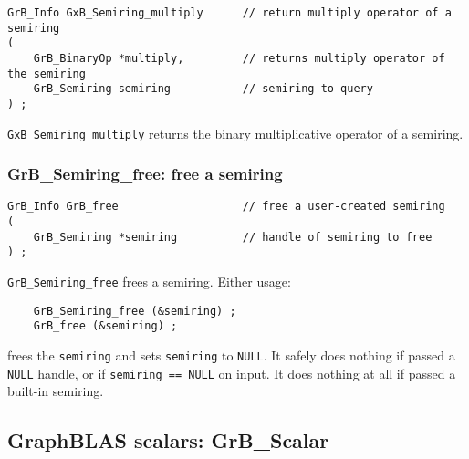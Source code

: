 \documentclass[12pt]{article}
\begin{document}
\begin{mdframed}[userdefinedwidth=6in]
{\footnotesize
\begin{verbatim}
GrB_Info GxB_Semiring_multiply      // return multiply operator of a semiring
(
    GrB_BinaryOp *multiply,         // returns multiply operator of the semiring
    GrB_Semiring semiring           // semiring to query
) ;
\end{verbatim}
} \end{mdframed}

\verb'GxB_Semiring_multiply' returns the binary multiplicative operator of a
semiring.

\subsubsection{{\sf GrB\_Semiring\_free:} free a semiring}
\label{semiring_free}

\begin{mdframed}[userdefinedwidth=6in]
{\footnotesize
\begin{verbatim}
GrB_Info GrB_free                   // free a user-created semiring
(
    GrB_Semiring *semiring          // handle of semiring to free
) ;
\end{verbatim}
} \end{mdframed}

\verb'GrB_Semiring_free' frees a semiring.  Either usage:

    {\small
    \begin{verbatim}
    GrB_Semiring_free (&semiring) ;
    GrB_free (&semiring) ; \end{verbatim}}

\noindent
frees the \verb'semiring' and sets \verb'semiring' to \verb'NULL'.  It safely
does nothing if passed a \verb'NULL' handle, or if \verb'semiring == NULL' on
input.  It does nothing at all if passed a built-in semiring.

\newpage
\subsection{GraphBLAS scalars: {\sf GrB\_Scalar}} %
\label{scalar}
\end{document}
